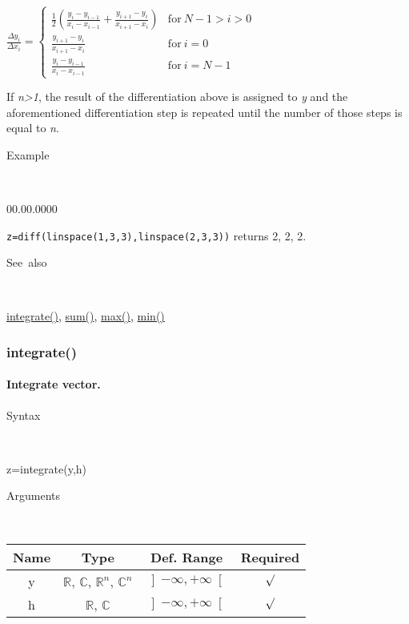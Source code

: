 \medskip{}
${\displaystyle \frac{\Delta y_{i}}{\Delta x_{i}}}=$$\left\{ \begin{array}{cc}
{\displaystyle \frac{1}{2}\left(\frac{y_{i}-y_{i-1}}{x_{i}-x_{i-1}}+\frac{y_{i+1}-y_{i}}{x_{i+1}-x_{i}}\right)} & \textrm{for}\: N-1>i>0\\
{\displaystyle \frac{y_{i+1}-y_{i}}{x_{i+1}-x_{i}}} & \textrm{for}\: i=0\\
{\displaystyle \frac{y_{i}-y_{i-1}}{x_{i}-x_{i-1}}} & \textrm{for}\: i=N-1\end{array}\right.$
\medskip{}

If \textit{n>1}, the result of the differentiation above
is assigned to \textit{y} and the aforementioned differentiation step
is repeated until the number of those steps is equal to \textit{n}.

\begin{description}
\item [Example]~
\end{description}
\begin{lyxlist}{00.00.0000}
\item [\texttt{z=diff(linspace(1,3,3),linspace(2,3,3))}]returns 2, 2, 2.
\end{lyxlist}
\begin{description}
\item [See~also]~
\end{description}
\textcolor{blue}{\hyperlink{integrate}{integrate()}}\textcolor{black}{,}
\textcolor{blue}{\hyperlink{sum}{sum()}}\textcolor{black}{,} \textcolor{blue}{\hyperlink{max}{max()}}\textcolor{black}{,}
\textcolor{blue}{\hyperlink{min}{min()}}


\newpage
\subsubsection*{\hypertarget{integrate}{}{\Large integrate()}}


\paragraph{\label{par:Integrate}Integrate vector.}

\begin{description}
\item [Syntax]~
\end{description}
z=integrate(y,h)

\begin{description}
\item [Arguments]~
\end{description}
\begin{tabular}{|c|c|c|c|}
\hline 
Name&
Type&
Def. Range&
Required\tabularnewline
\hline
\hline 
y&
$\mathbb{R}$, $\mathbb{C}$, $\mathbb{R}^{n}$, $\mathbb{C}^{n}$&
$\left]-\infty,+\infty\right[$&
$\surd$\tabularnewline
\hline 
h&
$\mathbb{R}$, $\mathbb{C}$&
$\left]-\infty,+\infty\right[$&
$\surd$\tabularnewline
\hline
\end{tabular}

